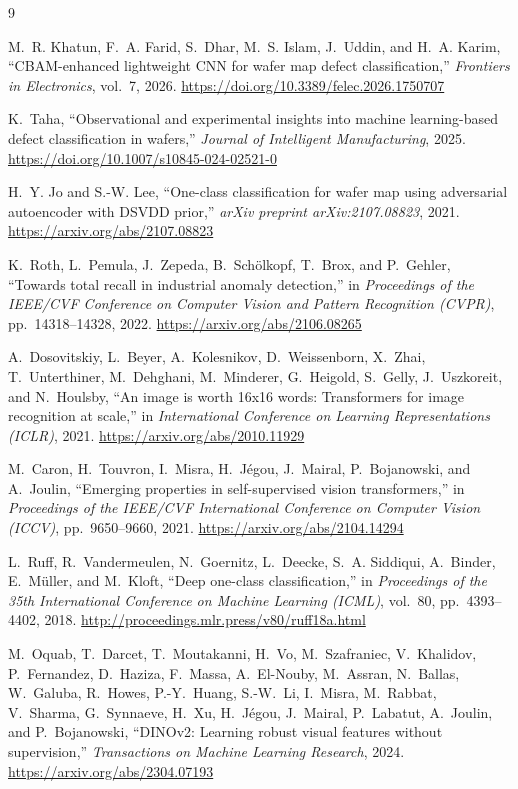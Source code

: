 \documentclass[11pt]{article}
\begin{document}
\newpage
\begin{thebibliography}{9}

M.~R. Khatun, F.~A. Farid, S.~Dhar, M.~S. Islam, J.~Uddin, and H.~A. Karim,
\newblock ``CBAM-enhanced lightweight CNN for wafer map defect classification,''
\newblock \textit{Frontiers in Electronics}, vol.~7, 2026.
\newblock \url{https://doi.org/10.3389/felec.2026.1750707}

K.~Taha,
\newblock ``Observational and experimental insights into machine learning-based defect classification in wafers,''
\newblock \textit{Journal of Intelligent Manufacturing}, 2025.
\newblock \url{https://doi.org/10.1007/s10845-024-02521-0}

H.~Y. Jo and S.-W. Lee,
\newblock ``One-class classification for wafer map using adversarial autoencoder with DSVDD prior,''
\newblock \textit{arXiv preprint arXiv:2107.08823}, 2021.
\newblock \url{https://arxiv.org/abs/2107.08823}

K.~Roth, L.~Pemula, J.~Zepeda, B.~Sch\"{o}lkopf, T.~Brox, and P.~Gehler,
\newblock ``Towards total recall in industrial anomaly detection,''
\newblock in \textit{Proceedings of the IEEE/CVF Conference on Computer Vision and Pattern Recognition (CVPR)},
\newblock pp.\ 14318--14328, 2022.
\newblock \url{https://arxiv.org/abs/2106.08265}

A.~Dosovitskiy, L.~Beyer, A.~Kolesnikov, D.~Weissenborn, X.~Zhai, T.~Unterthiner,
M.~Dehghani, M.~Minderer, G.~Heigold, S.~Gelly, J.~Uszkoreit, and N.~Houlsby,
\newblock ``An image is worth 16x16 words: Transformers for image recognition at scale,''
\newblock in \textit{International Conference on Learning Representations (ICLR)}, 2021.
\newblock \url{https://arxiv.org/abs/2010.11929}

M.~Caron, H.~Touvron, I.~Misra, H.~J\'{e}gou, J.~Mairal, P.~Bojanowski, and A.~Joulin,
\newblock ``Emerging properties in self-supervised vision transformers,''
\newblock in \textit{Proceedings of the IEEE/CVF International Conference on Computer Vision (ICCV)},
\newblock pp.\ 9650--9660, 2021.
\newblock \url{https://arxiv.org/abs/2104.14294}

L.~Ruff, R.~Vandermeulen, N.~Goernitz, L.~Deecke, S.~A. Siddiqui, A.~Binder, E.~M\"{u}ller, and M.~Kloft,
\newblock ``Deep one-class classification,''
\newblock in \textit{Proceedings of the 35th International Conference on Machine Learning (ICML)},
\newblock vol.\ 80, pp.\ 4393--4402, 2018.
\newblock \url{http://proceedings.mlr.press/v80/ruff18a.html}

M.~Oquab, T.~Darcet, T.~Moutakanni, H.~Vo, M.~Szafraniec, V.~Khalidov, P.~Fernandez,
D.~Haziza, F.~Massa, A.~El-Nouby, M.~Assran, N.~Ballas, W.~Galuba, R.~Howes,
P.-Y.~Huang, S.-W.~Li, I.~Misra, M.~Rabbat, V.~Sharma, G.~Synnaeve, H.~Xu,
H.~J\'{e}gou, J.~Mairal, P.~Labatut, A.~Joulin, and P.~Bojanowski,
\newblock ``DINOv2: Learning robust visual features without supervision,''
\newblock \textit{Transactions on Machine Learning Research}, 2024.
\newblock \url{https://arxiv.org/abs/2304.07193}

\end{thebibliography}
\end{document}
